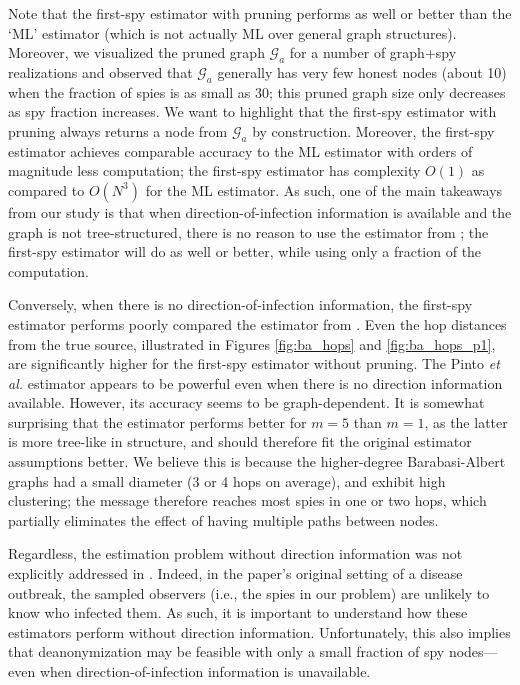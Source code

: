 Note that the first-spy estimator with pruning performs as well or better than the `ML' estimator (which is not actually ML over general graph structures). Moreover, we visualized the pruned graph $\mathcal G_a$ for a number of graph+spy realizations and observed that $\mathcal G_a$ generally has very few honest nodes (about 10) when the fraction of spies is as small as 30; this pruned graph size only decreases as spy fraction increases. 
We want to highlight that the first-spy estimator with pruning always returns a node from $\mathcal G_a$ by construction.  Moreover, the first-spy estimator achieves comparable accuracy to the ML estimator with orders of magnitude less computation; the first-spy estimator has complexity $O(1)$ as compared to $O(N^3)$ for the ML estimator. As such, one of the main takeaways from our study is that when direction-of-infection information is available and the graph is not tree-structured, there is no reason to use the estimator from \cite{pinto}; the first-spy estimator will do as well or better, while using only a fraction of the computation. 

Conversely, when there is no direction-of-infection information, the first-spy estimator performs poorly compared the estimator from \cite{pinto}. Even the hop distances from the true source, illustrated in Figures \ref{fig:ba_hops} and \ref{fig:ba_hops_p1}, are significantly higher for the first-spy estimator without pruning. The Pinto \emph{et al.} estimator appears to be powerful even when there is no direction information available. However, its accuracy seems to be graph-dependent. It is somewhat surprising that the estimator performs better for $m=5$ than $m=1$, as the latter is more tree-like in structure, and should therefore fit the original estimator assumptions better. We believe this is because the higher-degree Barabasi-Albert graphs had a small diameter (3 or 4 hops on average), and exhibit high clustering; the message therefore reaches most spies in one or two hops, which partially eliminates the effect of having multiple paths between nodes. 

Regardless, the estimation problem without direction information was not explicitly addressed in \cite{pinto}. Indeed, in the paper's original setting of a disease outbreak, the sampled observers (i.e., the spies in our problem) are unlikely to know who infected them. As such, it is important to understand how these estimators perform without direction information. Unfortunately, this also implies that deanonymization may be feasible with only a small fraction of spy nodes---even when direction-of-infection information is unavailable.




